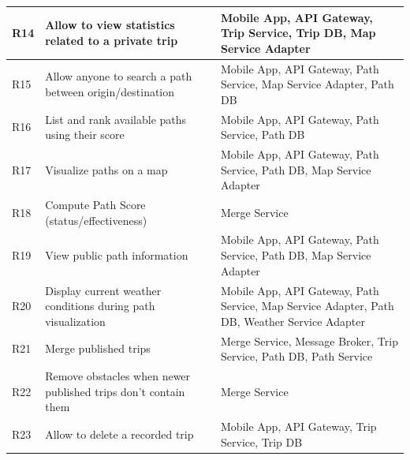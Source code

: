 \begin{tabular}{|l|p{6cm}|p{7cm}|}
\hline
R14 & Allow to view statistics related to a private trip & Mobile App, API Gateway, Trip Service, Trip DB, Map Service Adapter \\
\hline
R15 & Allow anyone to search a path between origin/destination & Mobile App, API Gateway, Path Service, Map Service Adapter, Path DB \\
\hline
R16 & List and rank available paths using their score & Mobile App, API Gateway, Path Service, Path DB \\
\hline
R17 & Visualize paths on a map & Mobile App, API Gateway, Path Service, Path DB, Map Service Adapter \\
\hline
R18 & Compute Path Score (status/effectiveness) & Merge Service \\
\hline
R19 & View public path information & Mobile App, API Gateway, Path Service, Path DB, Map Service Adapter \\
\hline
R20 & Display current weather conditions during path visualization & Mobile App, API Gateway, Path Service, Map Service Adapter, Path DB, Weather Service Adapter \\
\hline
R21 & Merge published trips & Merge Service, Message Broker, Trip Service, Path DB, Path Service \\
\hline
R22 & Remove obstacles when newer published trips don't contain them & Merge Service \\
\hline
R23 & Allow to delete a recorded trip & Mobile App, API Gateway, Trip Service, Trip DB \\
\hline
\end{tabular}
